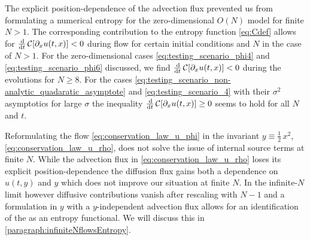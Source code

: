 The explicit position-dependence of the advection flux prevented us from formulating a numerical entropy for the zero-dimensional $O(N)$ model for finite $N > 1$.
The corresponding contribution to the entropy function \eqref{eq:Cdef} allows for $\tfrac{\dif}{\dif t} \, \mathcal{C} [ \partial_x u ( t, x ) ] < 0$ during \frg{} flow for certain initial conditions and $N$ in the case of $N > 1$.
For the zero-dimensional cases \eqref{eq:testing_scenario_phi4} and \eqref{eq:testing_scenario_phi6} discussed, we find $\tfrac{\dif}{\dif t} \, \mathcal{C} [ \partial_x u ( t, x ) ] < 0$ during the \rg{} evolutions for $N \geq 8$.
For the cases \eqref{eq:testing_scenario_non-analytic_quadaratic_asymptote} and \eqref{eq:testing_scenario_4} with their $\sigma^2$ asymptotics for large $\sigma$ the inequality $\tfrac{\dif}{\dif t} \, \mathcal{C} [ \partial_x u ( t, x ) ] \geq 0$ seems to hold for all $N$ and $t$.

Reformulating the \frg{} flow \cref{eq:conservation_law_u_phi} in the invariant $y\equiv \tfrac{1}{2} \, x^2$, \cf{} \cref{eq:conservation_law_u_rho}, does not solve the issue of internal source terms at finite $N$. 
While the advection flux in \cref{eq:conservation_law_u_rho} loses its explicit position-dependence the diffusion flux gains both a dependence on $u(t,y)$ and $y$ which does not improve our situation at finite $N$.
In the infinite-$N$ limit however diffusive contributions vanish after rescaling with $N-1$ and a formulation in $y$ with a $y$-independent advection flux allows for an identification of the \tv{} as an entropy functional.
We will discuss this in \cref{paragraph:infiniteNflowsEntropy}.

\vspace{-.65em}
